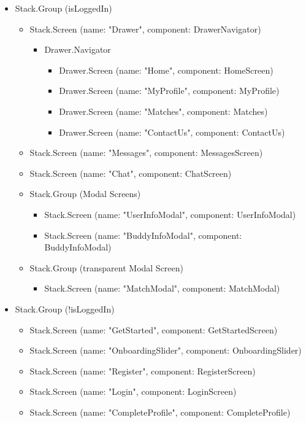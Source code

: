         \begin{itemize}
            \item Stack.Group (isLoggedIn)
            \begin{itemize}
                \item Stack.Screen (name: "Drawer", component: DrawerNavigator)
                \begin{itemize}
                    \item Drawer.Navigator
                    \begin{itemize}
                        \item Drawer.Screen (name: "Home", component: HomeScreen)
                        \item Drawer.Screen (name: "MyProfile", component: MyProfile)
                        \item Drawer.Screen (name: "Matches", component: Matches)
                        \item Drawer.Screen (name: "ContactUs", component: ContactUs)         
                    \end{itemize}
                \end{itemize}
                \item Stack.Screen (name: "Messages", component: MessagesScreen)
                \item Stack.Screen (name: "Chat", component: ChatScreen)
                \item Stack.Group (Modal Screens)
                \begin{itemize}
                    \item Stack.Screen (name: "UserInfoModal", component: UserInfoModal)
                    \item Stack.Screen (name: "BuddyInfoModal", component: BuddyInfoModal)
                \end{itemize}
                \item Stack.Group (transparent Modal Screen)
                \begin{itemize}
                    \item Stack.Screen (name: "MatchModal", component: MatchModal)
                \end{itemize}
            \end{itemize}
            \item Stack.Group (!isLoggedIn)
            \begin{itemize}
                \item Stack.Screen (name: "GetStarted", component: GetStartedScreen)
                \item Stack.Screen (name: "OnboardingSlider", component: OnboardingSlider)
                \item Stack.Screen (name: "Register", component: RegisterScreen)
                \item Stack.Screen (name: "Login", component: LoginScreen)
                \item Stack.Screen (name: "CompleteProfile", component: CompleteProfile)
            \end{itemize}
        \end{itemize}
